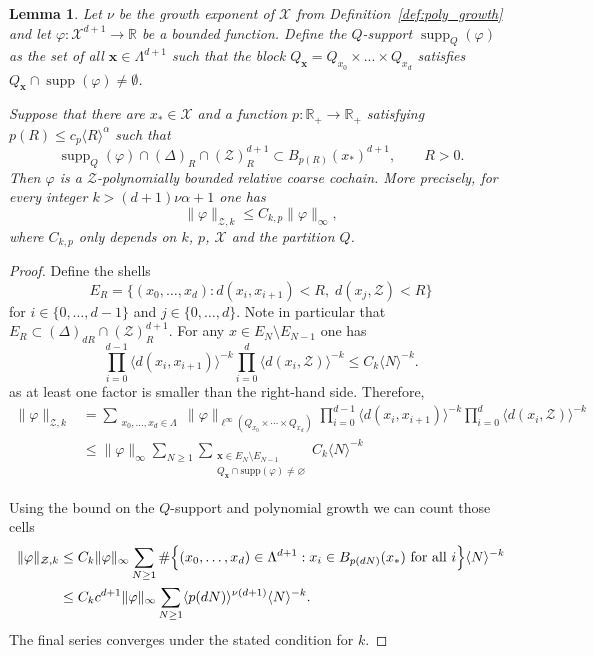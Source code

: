 \documentclass[12pt]{amsart}
\newtheorem{lemma}[theorem]{Lemma}
\newcommand{\RM}{{\mathbb R}}
\newcommand{\Xx}{{\mathcal X}}
\newcommand{\Zz}{{\mathcal Z}}
\DeclareMathOperator{\supp}{supp}
\begin{document}
\begin{lemma}
\label{lemma:poly_bounded_from_support}
Let $\nu$ be the growth exponent of $\Xx$ from Definition~\ref{def:poly_growth} and let $\varphi: \Xx^{d+1}\to \RM$ be a bounded function. Define the $Q$-support $\supp_{Q}(\varphi)$ as the set of all $\mathbf x\in \Lambda^{d+1}$ such that the block $Q_{\mathbf x}=Q_{x_0}\times ... \times Q_{x_d}$ satisfies $Q_{\mathbf x}\cap \supp(\varphi)\neq \emptyset$.

Suppose that there are $x_*\in\Xx$ and a function
$p:\RM_+\to\RM_+$ satisfying $p(R)\leq c_p\langle R\rangle^\alpha$ such that
\[ \operatorname{supp}_Q(\varphi) \cap(\Delta)_R\cap(\Zz)_R^{d+1} \subset B_{p(R)}(x_*)^{d+1}, \qquad R>0.\]
Then $\varphi$ is a $\Zz$-polynomially bounded relative coarse
cochain. More precisely, for every integer $k>(d+1)\nu\alpha+1$
one has
\[ \|\varphi\|_{\Zz,k} \leq C_{k,p}\|\varphi\|_\infty,\]
where $C_{k,p}$ only depends on $k$, $p$, $\Xx$ and the partition $Q$.
\end{lemma}
\begin{proof}
Define the shells
\[E_R= \{(x_0,\dots,x_d): d(x_i, x_{i+1})<R, \; d(x_j, \Zz)< R\}\]
for $i\in \{0,\dots, d-1\}$ and $j \in \{0,\dots, d\}.$
Note in particular that $E_R \subset (\Delta)_{dR}\cap (\Zz)_R^{d+1}$. For any $x\in E_N\setminus E_{N-1}$ one has
$$\prod_{i=0}^{d-1}
\langle d(x_i,x_{i+1})\rangle^{-k}
 \prod_{i=0}^{d}
 \langle d(x_i,\Zz)\rangle^{-k}
\leq C_k\langle N\rangle^{-k}.$$
as at least one factor is smaller than the right-hand side. 
Therefore, 
\begin{align*}
\|\varphi\|_{\Zz,k} &= \sum_{\substack{x_0,\dots,x_{d}\in \Lambda}} \|\varphi\|_{\ell^\infty(
Q_{x_0}\times\cdots\times Q_{x_d})}  \prod_{i=0}^{d-1} \langle d(x_i, x_{i+1})\rangle^{-k} \prod_{i=0}^{d}\langle d(x_i, \Zz)\rangle^{-k} \\
&\leq \|\varphi\|_\infty \sum_{N\geq 1} \sum_{\substack{\mathbf x \in E_N\setminus E_{N-1} \\ Q_{\mathbf x}\cap  \mathrm{supp}(\varphi)\neq \varnothing}}   C_k\langle N\rangle^{-k} 
\end{align*}

Using the bound on the $Q$-support and polynomial growth we can count those cells
\begin{align*}
\|\varphi\|_{\Zz,k}
&\leq
C_k\|\varphi\|_\infty
\sum_{N\geq1}
\#\Bigl\{
(x_0,\ldots,x_d)\in\Lambda^{d+1}: x_i \in B_{p(dN)}(x_*) \text{ for all }i
\Bigr\}
\langle N\rangle^{-k} \\
&\leq
C_k c^{d+1}\|\varphi\|_\infty
\sum_{N\geq1}
\langle p(dN)\rangle^{\nu(d+1)}
\langle N\rangle^{-k}.
\end{align*}
The final series converges under the stated condition for $k$.

\end{proof}
\end{document}
